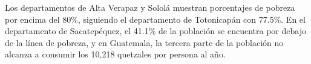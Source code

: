Los departamentos de Alta Verapaz y Sololá muestran porcentajes de pobreza por encima del 80\%, siguiendo el departamento de Totonicapán con 77.5\%. En el departamento de Sacatepéquez, el 41.1\% de la población se encuentra por debajo de la línea de pobreza, y en Guatemala, la tercera parte de la población no alcanza a consumir los 10,218 quetzales por persona al año.